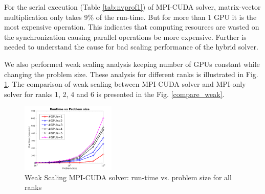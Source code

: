 \documentclass[sigplan,screen]{acmart}
\begin{document}
For the serial execution (Table \ref{tab:nvprof1}) of MPI-CUDA solver, matrix-vector multiplication only takes 9\% of the run-time. But for more than 1 GPU it is the most expensive operation. This indicates that computing resources are wasted on the synchronization causing parallel operations be more expensive. Further is needed to understand the cause for bad scaling performance of the hybrid solver.

We also performed weak scaling analysis keeping number of GPUs constant while changing the problem size. These analysis for different ranks is illustrated in Fig. \ref{cuda-weak}. The comparison of weak scaling between MPI-CUDA solver and MPI-only solver for ranks 1, 2, 4 and 6 is presented in the Fig. \ref{compare_weak}.

\begin{figure}[h!]
	\begin{center}
		\includegraphics[width=0.4\textwidth]{CUDA_weak_allrank.png}
	\end{center}
	\caption{Weak Scaling MPI-CUDA solver: run-time vs. problem size for all ranks}
	\label{cuda-weak}      
\end{figure}
\end{document}
